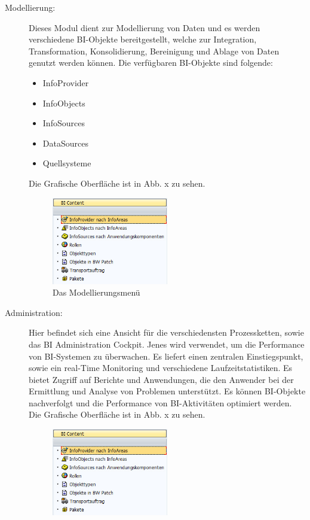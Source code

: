 \begin{description}
\item[Modellierung:] Dieses Modul dient zur Modellierung von Daten und es werden verschiedene BI-Objekte bereitgestellt, welche zur Integration, Transformation, Konsolidierung, Bereinigung und Ablage von Daten genutzt werden können. Die verfügbaren BI-Objekte sind folgende:
\begin{itemize}
\item InfoProvider
\item InfoObjects
\item InfoSources
\item DataSources
\item Quellsysteme
\end{itemize}
Die Grafische Oberfläche ist in Abb. x zu sehen.
\begin{figure}[H]
    \centering
    \includegraphics[width=0.5\textwidth]{files/BIContent}
    \caption{Das Modellierungsmenü}
    \label{pic:DWOverview}
\end{figure}
\item[Administration:] Hier befindet sich eine Ansicht für die verschiedensten Prozessketten, sowie das BI Administration Cockpit. Jenes wird verwendet, um die Performance von BI-Systemen zu überwachen. Es liefert einen zentralen Einstiegspunkt, sowie ein real-Time Monitoring und verschiedene Laufzeitstatistiken. Es bietet Zugriff auf Berichte und Anwendungen, die den Anwender bei der Ermittlung und Analyse von Problemen unterstützt. Es können BI-Objekte nachverfolgt und die Performance von BI-Aktivitäten optimiert werden.
Die Grafische Oberfläche ist in Abb. x zu sehen.
\begin{figure}[H]
    \centering
    \includegraphics[width=0.5\textwidth]{files/BIContent}

\end{figure}
\end{description}
